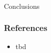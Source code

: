 \begin{frame}[fragile]\frametitle{}
\begin{center}
{\Large Conclusions}
\end{center}
\end{frame}

\begin{frame}[fragile]\frametitle{References}


\begin{itemize}
\item tbd
\end{itemize}


\end{frame}